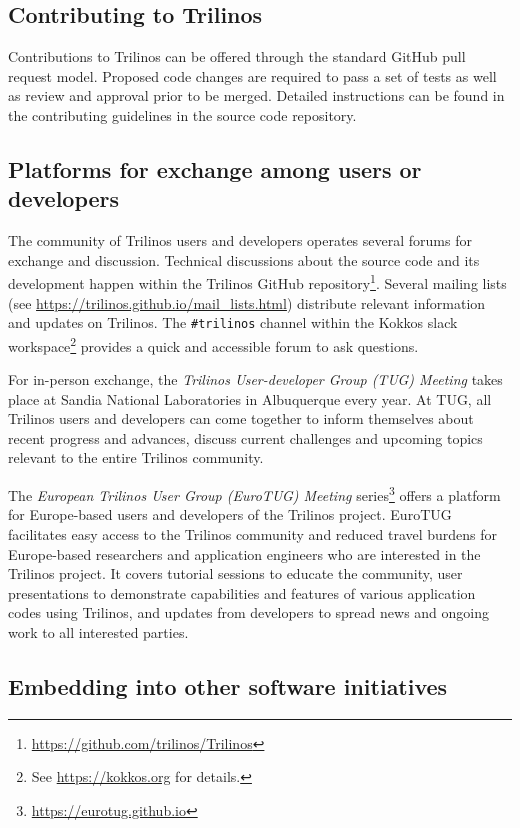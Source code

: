
\subsection{Contributing to Trilinos}

Contributions to Trilinos can be offered through the standard GitHub pull request model.
Proposed code changes are required to pass a set of tests as well as review and approval prior to be merged.
Detailed instructions can be found in the contributing guidelines in the source code repository.

\subsection{Platforms for exchange among users or developers}

The community of Trilinos users and developers operates several forums for exchange and discussion.
Technical discussions about the source code and its development happen within the Trilinos GitHub repository\footnote{\url{https://github.com/trilinos/Trilinos}}.
Several mailing lists (see \url{https://trilinos.github.io/mail_lists.html}) distribute relevant information and updates on Trilinos.
The \texttt{\#trilinos} channel within the Kokkos slack workspace\footnote{See \url{https://kokkos.org} for details.} provides a quick and accessible forum to ask questions.

For in-person exchange, the \emph{Trilinos User-developer Group (TUG) Meeting} takes place at Sandia National Laboratories in Albuquerque every year.
At TUG, all Trilinos users and developers can come together to inform themselves about recent progress and advances,
discuss current challenges and upcoming topics relevant to the entire Trilinos community.

The \emph{European Trilinos User Group (EuroTUG) Meeting} series\footnote{\url{https://eurotug.github.io}}
offers a platform for Europe-based users and developers of the Trilinos project.
EuroTUG facilitates easy access to the Trilinos community and reduced travel burdens for Europe-based researchers and application engineers
who are interested in the Trilinos project.
It covers tutorial sessions to educate the community,
user presentations to demonstrate capabilities and features of various application codes using Trilinos,
and updates from developers to spread news and ongoing work to all interested parties.

\subsection{Embedding into other software initiatives}

